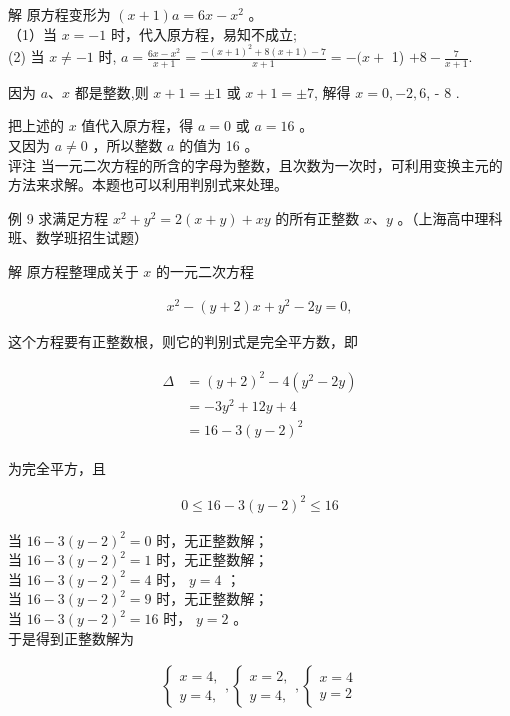 \documentclass[10pt]{article}
\begin{document}
解 原方程变形为 $(x+1) a=6 x-x^{2}$ 。\\
（1）当 $x=-1$ 时，代入原方程，易知不成立;\\
(2) 当 $x \neq-1$ 时, $a=\frac{6 x-x^{2}}{x+1}=\frac{-(x+1)^{2}+8(x+1)-7}{x+1}=-(x+$ 1) $+8-\frac{7}{x+1}$.

因为 $a 、 x$ 都是整数,则 $x+1= \pm 1$ 或 $x+1= \pm 7$, 解得 $x=0,-2,6$, - 8 .

把上述的 $x$ 值代入原方程，得 $a=0$ 或 $a=16$ 。\\
又因为 $a \neq 0$ ，所以整数 $a$ 的值为 16 。\\
评注 当一元二次方程的所含的字母为整数，且次数为一次时，可利用变换主元的方法来求解。本题也可以利用判别式来处理。

例 9 求满足方程 $x^{2}+y^{2}=2(x+y)+x y$ 的所有正整数 $x 、 y$ 。（上海高中理科班、数学班招生试题）

解 原方程整理成关于 $x$ 的一元二次方程

\begin{align*}
x^{2}-(y+2) x+y^{2}-2 y=0,
\end{align*}

这个方程要有正整数根，则它的判别式是完全平方数，即

\begin{align*}
\begin{aligned}
\Delta & =(y+2)^{2}-4\left(y^{2}-2 y\right) \\
& =-3 y^{2}+12 y+4 \\
& =16-3(y-2)^{2}
\end{aligned}
\end{align*}

为完全平方，且

\begin{align*}
0 \leqslant 16-3(y-2)^{2} \leqslant 16
\end{align*}

当 $16-3(y-2)^{2}=0$ 时，无正整数解；\\
当 $16-3(y-2)^{2}=1$ 时，无正整数解；\\
当 $16-3(y-2)^{2}=4$ 时， $y=4$ ；\\
当 $16-3(y-2)^{2}=9$ 时，无正整数解；\\
当 $16-3(y-2)^{2}=16$ 时， $y=2$ 。\\
于是得到正整数解为

\begin{align*}
\left\{\begin{array}{l}
x=4, \\
y=4,
\end{array},\left\{\begin{array}{l}
x=2, \\
y=4,
\end{array},\left\{\begin{array}{l}
x=4 \\
y=2
\end{array}\right.\right.\right.
\end{align*}
\end{document}
